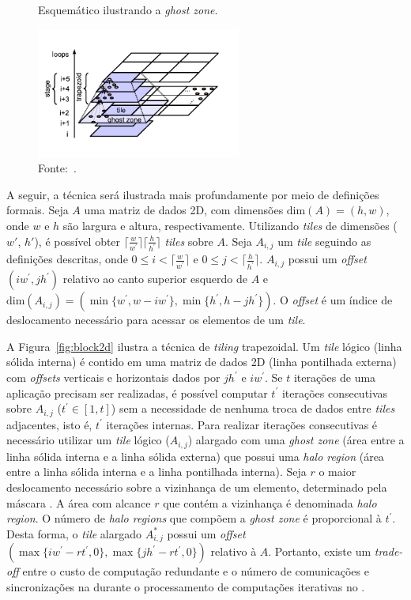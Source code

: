 \begin{figure}[!h]
	\centering
    \caption{Esquemático ilustrando a \textit{ghost zone}.}
    \includegraphics[width=0.6\textwidth]{figs/tiling.pdf}
    \caption*{Fonte:~\cite{meng11}.}
    \label{fig:tiling}
\end{figure}



A seguir, a técnica será ilustrada mais profundamente
por meio de definições formais. Seja $A$ uma matriz de dados 2D, com dimensões
$\textrm{dim}(A) = (h,w)$, onde $w$ e $h$ são largura e altura, respectivamente.
Utilizando \textit{tiles} de dimensões ($w'$, $h'$), é possível obter
$\lceil\frac{w}{w^\prime}\rceil\lceil\frac{h}{h^\prime}\rceil$ \textit{tiles}
sobre $A$. Seja $A_{i,j}$ um \textit{tile} seguindo as definições descritas,
onde $0 \leq i < \lceil\frac{w}{w^\prime}\rceil$ e $0\leq j <
\lceil\frac{h}{h^\prime}\rceil$. $A_{i,j}$ possui um \textit{offset} $(i
w^\prime, j h^\prime)$ relativo ao canto superior esquerdo de $A$ e
$\textrm{dim}(A_{i,j}) = (\min\{w^\prime, w-i w^\prime\}, \min\{h^\prime, h-j
h^\prime\})$. O \textit{offset} é um índice de deslocamento necessário para
acessar os elementos de um \textit{tile}.

A Figura~\ref{fig:block2d} ilustra a técnica de \textit{tiling} trapezoidal. Um
\textit{tile} lógico (linha sólida interna) é contido em uma matriz de dados 2D
(linha pontilhada externa) com \textit{offsets} verticais e horizontais dados
por $jh^\prime$ e $iw^\prime$. Se $t$ iterações de uma aplicação \stencil
precisam ser realizadas, é possível computar $t^\prime$ iterações consecutivas
sobre $A_{i,j}$ ($t^\prime \in \left[1,t\right]$) sem a necessidade de nenhuma
troca de dados entre \textit{tiles} adjacentes, isto é, $t^\prime$ iterações
internas. Para realizar iterações consecutivas é necessário utilizar um
\textit{tile} lógico ($A_{i,j}$) alargado com uma \textit{ghost zone} (área
entre a linha sólida interna e a linha sólida externa) que possui uma
\textit{halo region} (área entre a linha sólida interna e a linha pontilhada
interna). Seja $r$ o maior deslocamento necessário sobre a vizinhança de um
elemento, determinado pela máscara \stencil. A área com alcance $r$ que contém a
vizinhança é denominada \textit{halo region}. O número de \textit{halo regions}
que compõem a \textit{ghost zone} é proporcional à $t^\prime$. Desta forma, o
\textit{tile} alargado $A^\ast_{i,j}$ possui um \textit{offset} $(\max\{iw^\prime -
rt^\prime, 0\}, \max\{jh^\prime - rt^\prime, 0\})$ relativo à $A$. Portanto,
existe um \textit{trade-off} entre o custo de computação redundante e o número
de comunicações e sincronizações na \noc durante o processamento de computações
\stencil iterativas no \mppa.


